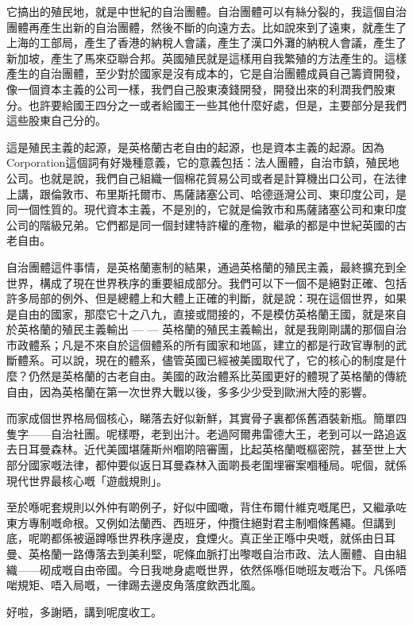 它搞出的殖民地，就是中世紀的自治團體。自治團體可以有絲分裂的，我這個自治團體再產生出新的自治團體，然後不斷的向遠方去。比如說來到了遠東，就產生了上海的工部局，產生了香港的納稅人會議，產生了漢口外灘的納稅人會議，產生了新加坡，產生了馬來亞聯合邦。英國殖民就是這樣用自我繁殖的方法產生的。這樣產生的自治團體，至少對於國家是沒有成本的，它是自治團體成員自己籌資開發，像一個資本主義的公司一樣，我們自己股東湊錢開發，開發出來的利潤我們股東分。也許要給國王四分之一或者給國王一些其他什麼好處，但是，主要部分是我們這些股東自己分的。

這是殖民主義的起源，是英格蘭古老自由的起源，也是資本主義的起源。因為Corporation這個詞有好幾種意義，它的意義包括：法人團體，自治市鎮，殖民地公司。也就是說，我們自己組織一個棉花貿易公司或者是計算機出口公司，在法律上講，跟倫敦市、布里斯托爾市、馬薩諸塞公司、哈德遜灣公司、東印度公司，是同一個性質的。現代資本主義，不是別的，它就是倫敦市和馬薩諸塞公司和東印度公司的階級兄弟。它們都是同一個封建特許權的產物，繼承的都是中世紀英國的古老自由。

自治團體這件事情，是英格蘭憲制的結果，通過英格蘭的殖民主義，最終擴充到全世界，構成了現在世界秩序的重要組成部分。我們可以下一個不是絕對正確、包括許多局部的例外、但是總體上和大體上正確的判斷，就是說：現在這個世界，如果是自由的國家，那麼它十之八九，直接或間接的，不是模仿英格蘭王國，就是來自於英格蘭的殖民主義輸出 — — 英格蘭的殖民主義輸出，就是我剛剛講的那個自治市政體系；凡是不來自於這個體系的所有國家和地區，建立的都是行政官專制的武斷體系。可以說，現在的體系，儘管英國已經被美國取代了，它的核心的制度是什麼？仍然是英格蘭的古老自由。美國的政治體系比英國更好的體現了英格蘭的傳統自由，因為英格蘭在第一次世界大戰以後，多多少少受到歐洲大陸的影響。

而家成個世界格局個核心，睇落去好似新鮮，其實骨子裏都係舊酒裝新瓶。簡單四隻字——自治社團。呢樣嘢，老到出汁。老過阿爾弗雷德大王，老到可以一路追返去日耳曼森林。近代美國堪薩斯州嗰啲陪審團，比起英格蘭嘅樞密院，甚至世上大部分國家嘅法律，都仲要似返日耳曼森林入面啲長老圍埋審案嗰種局。呢個，就係現代世界最核心嘅「遊戲規則」。

至於喺呢套規則以外仲有啲例子，好似中國噉，背住布爾什維克嘅尾巴，又繼承咗東方專制嘅命根。又例如法蘭西、西班牙，仲攬住絕對君主制嗰條舊繩。但講到底，呢啲都係被逼蹲喺世界秩序邊皮，食煙火。真正坐正喺中央嘅，就係由日耳曼、英格蘭一路傳落去到美利堅，呢條血脈打出嚟嘅自治市政、法人團體、自由組織——砌成嘅自由帝國。今日我哋身處嘅世界，依然係喺佢哋班友嘅治下。凡係唔啱規矩、唔入局嘅，一律踢去邊皮角落度飲西北風。

好啦，多謝晒，講到呢度收工。




